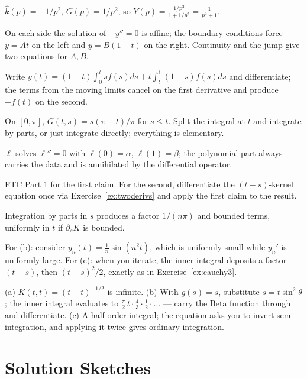 \documentclass{essay}
\begin{document}
\begin{description}[leftmargin=0pt, itemsep=4pt]
\item[\ref{ex:convolution}.] $\widehat{k}(p) = -1/p^2$, $G(p) = 1/p^2$, so $Y(p) = \frac{1/p^2}{1 + 1/p^2} = \frac{1}{p^2 + 1}$.
\item[\ref{ex:green-construct}.] On each side the solution of $-y''=0$ is affine; the boundary conditions force $y = At$ on the left and $y = B(1-t)$ on the right. Continuity and the jump give two equations for $A, B$.
\item[\ref{ex:green-verify}.] Write $y(t) = (1-t)\int_0^t s f(s) ds + t \int_t^1 (1-s) f(s) ds$ and differentiate; the terms from the moving limits cancel on the first derivative and produce $-f(t)$ on the second.
\item[\ref{ex:eigen}.] On $[0,\pi]$, $G(t,s) = s(\pi - t)/\pi$ for $s \le t$. Split the integral at $t$ and integrate by parts, or just integrate directly; everything is elementary.
\item[\ref{ex:inhomog-bc}.] $\ell$ solves $\ell'' = 0$ with $\ell(0) = \alpha$, $\ell(1) = \beta$; the polynomial part always carries the data and is annihilated by the differential operator.
\item[\ref{ex:bootstrap}.] FTC Part 1 for the first claim. For the second, differentiate the $(t-s)$-kernel equation once via Exercise~\ref{ex:twoderivs} and apply the first claim to the result.
\item[\ref{ex:illposed}.] Integration by parts in $s$ produces a factor $1/(n\pi)$ and bounded terms, uniformly in $t$ if $\partial_s K$ is bounded.
\item[\ref{ex:contraction}.] For (b): consider $y_n(t) = \frac{1}{n}\sin(n^2 t)$, which is uniformly small while $y_n'$ is uniformly large. For (c): when you iterate, the inner integral deposits a factor $(t - s)$, then $(t-s)^2/2$, exactly as in Exercise~\ref{ex:cauchy3}.
\item[\ref{ex:abel}.] (a) $K(t,t) = (t-t)^{-1/2}$ is infinite. (b) With $g(s) = s$, substitute $s = t\sin^2\theta$; the inner integral evaluates to $\tfrac{\pi}{2}\, t \cdot \frac{4}{3}\cdot\frac{1}{2}\cdot\ldots$ --- carry the Beta function through and differentiate. (c) A half-order integral; the equation asks you to invert semi-integration, and applying it twice gives ordinary integration.
\end{description}

\clearpage
\section{Solution Sketches}
\end{document}
